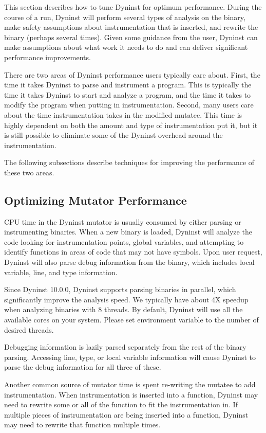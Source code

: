 This section describes how to tune Dyninst for optimum performance.
During the course of a run, Dyninst will perform
several types of analysis on the binary, make safety assumptions
about instrumentation that is inserted, and rewrite
the binary (perhaps several times). Given some guidance from the
user, Dyninst can make assumptions about what work
it needs to do and can deliver significant performance improvements.

There are two areas of Dyninst performance users typically care
about. First, the time it takes Dyninst to parse and
instrument a program. This is typically the time it takes Dyninst to
start and analyze a program, and the time it
takes to modify the program when putting in instrumentation. Second,
many users care about the time instrumentation
takes in the modified mutatee. This time is highly dependent on both
the amount and type of instrumentation put it,
but it is still possible to eliminate some of the Dyninst overhead
around the instrumentation.

The following subsections describe techniques for improving the
performance of these two areas.

\subsection{Optimizing Mutator Performance}

CPU time in the Dyninst mutator is usually consumed by either parsing
or instrumenting binaries. When a new binary is
loaded, Dyninst will analyze the code looking for instrumentation
points, global variables, and attempting to identify
functions in areas of code that may not have symbols. Upon user
request, Dyninst will also parse debug information
from the binary, which includes local variable, line, and type information.

Since Dyninst 10.0.0, Dyninst supports parsing binaries in parallel,
which significantly improve the analysis speed. We
typically have about 4X speedup when analyzing binaries with 8
threads. By default, Dyninst will use all the available
cores on your system. Please set environment variable 
to the number of desired threads.

Debugging information is lazily parsed separately from the rest of
the binary parsing. Accessing line, type, or local
variable information will cause Dyninst to parse the debug
information for all three of these.

Another common source of mutator time is spent re-writing the mutatee
to add instrumentation. When instrumentation is
inserted into a function, Dyninst may need to rewrite some or all of
the function to fit the instrumentation in. If
multiple pieces of instrumentation are being inserted into a
function, Dyninst may need to rewrite that function
multiple times.

